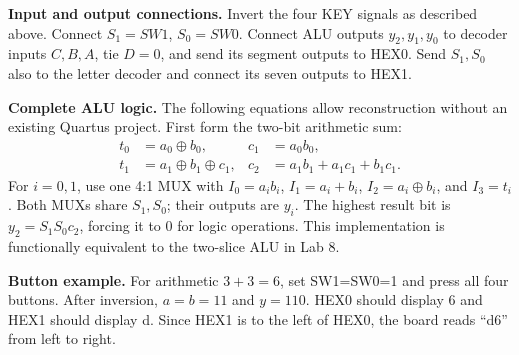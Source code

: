 \documentclass[a4paper,11pt]{article}
\begin{document}
\textbf{Input and output connections.} Invert the four KEY signals as described above.
Connect $S_1=SW1$, $S_0=SW0$. Connect ALU outputs $y_2,y_1,y_0$ to decoder inputs
$C,B,A$, tie $D=0$, and send its segment outputs to HEX0. Send $S_1,S_0$ also to the
letter decoder and connect its seven outputs to HEX1.


\begin{center}\end{center}

\textbf{Complete ALU logic.} The following equations allow reconstruction
without an existing Quartus project. First form the two-bit arithmetic sum:
\begin{align*}
t_0&=a_0\oplus b_0,&c_1&=a_0b_0,\\
t_1&=a_1\oplus b_1\oplus c_1,&c_2&=a_1b_1+a_1c_1+b_1c_1.
\end{align*}
For $i=0,1$, use one 4:1 MUX with $I_0=a_ib_i$, $I_1=a_i+b_i$,
$I_2=a_i\oplus b_i$, and $I_3=t_i$. Both MUXs share $S_1,S_0$; their outputs are
$y_i$. The highest result bit is $y_2=S_1S_0c_2$, forcing it to 0 for logic operations.
This implementation is functionally equivalent to the two-slice ALU in Lab 8.

\textbf{Button example.} For arithmetic $3+3=6$, set SW1=SW0=1 and press all four
buttons. After inversion, $a=b=11$ and $y=110$. HEX0 should display 6 and HEX1 should
display d. Since HEX1 is to the left of HEX0, the board reads ``d6'' from left to right.
\end{document}
